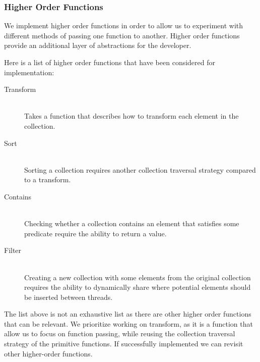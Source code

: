 \subsubsection{Higher Order Functions}
We implement higher order functions in order to allow us to experiment with different methods of passing one function to another. Higher order functions provide an additional layer of abstractions for the developer.


Here is a list of higher order functions that have been considered for implementation:
\begin{description}
\item[Transform]\hfill\\
Takes a function that describes how to transform each element in the collection.
\item[Sort] \hfill \\ 
Sorting a collection requires another collection traversal strategy compared to a transform.
\item[Contains] \hfill \\ 
Checking whether a collection contains an element that satisfies some predicate require the ability to return a value.
\item[Filter] \hfill \\ 
Creating a new collection with some elements from the original collection requires the ability to dynamically share where potential elements should be inserted between threads.
\end{description}

The list above is not an exhaustive list as there are other higher order functions that can be relevant. We prioritize working on transform, as it is a function that allow us to focus on function passing, while reusing the collection traversal strategy of the primitive functions. If successfully implemented we can revisit other higher-order functions.